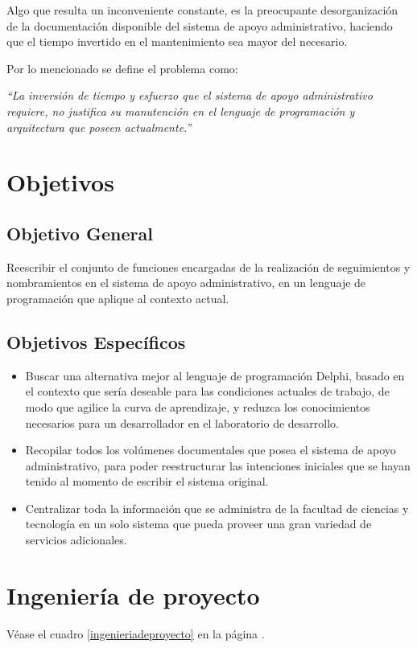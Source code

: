\documentclass[letterpaper,11pt]{article}
\begin{document}
Algo que resulta un inconveniente constante, es la preocupante desorganización de la documentación disponible del sistema de apoyo administrativo, haciendo que el tiempo invertido en el mantenimiento sea mayor del necesario.

Por lo mencionado se define el problema como:

\emph{“La inversión de tiempo y esfuerzo que el sistema de apoyo administrativo
requiere, no justifica su manutención en el lenguaje de programación y
arquitectura que poseen actualmente.”}

\section{Objetivos}

\subsection{Objetivo General}
Reescribir el conjunto de funciones encargadas de la realización de
seguimientos y nombramientos en el sistema de apoyo administrativo, en un
lenguaje de programación que aplique al contexto actual.

\subsection{Objetivos Específicos}
\begin{itemize}
\item Buscar una alternativa mejor al lenguaje de programación Delphi, basado
      en el contexto que sería deseable para las condiciones actuales de
      trabajo, de modo que agilice la curva de aprendizaje, y reduzca los
      conocimientos necesarios para un desarrollador en el laboratorio de
      desarrollo.
\item Recopilar todos los volúmenes documentales que posea el sistema de apoyo
      administrativo, para poder reestructurar las intenciones iniciales que se
      hayan tenido al momento de escribir el sistema original.
\item Centralizar toda la información que se administra de la facultad de
      ciencias y tecnología en un solo sistema que pueda proveer una gran
      variedad de servicios adicionales.
\end{itemize}

\section{Ingeniería de proyecto}
Véase el cuadro \ref{ingenieriadeproyecto} en la página
\pageref{ingenieriadeproyecto}.
\end{document}
